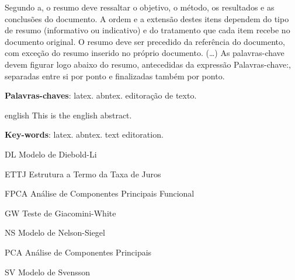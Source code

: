 \documentclass[
	12pt,				%
	openright,			%
	oneside,			%
	a4paper,			%
	english,			%
	brazil				%
	]{dissertacao-ufrgs-abntex2}
\begin{document}

\setlength{\absparsep}{18pt} %
\begin{resumo}
 Segundo a, o resumo deve ressaltar o
 objetivo, o método, os resultados e as conclusões do documento. A ordem e a extensão
 destes itens dependem do tipo de resumo (informativo ou indicativo) e do
 tratamento que cada item recebe no documento original. O resumo deve ser
 precedido da referência do documento, com exceção do resumo inserido no
 próprio documento. (\ldots) As palavras-chave devem figurar logo abaixo do
 resumo, antecedidas da expressão Palavras-chave:, separadas entre si por
 ponto e finalizadas também por ponto.

 \textbf{Palavras-chaves}: latex. abntex. editoração de texto.
\end{resumo}

\begin{resumo}[Abstract]
 \begin{otherlanguage*}{english}
   This is the english abstract.

   \vspace{\onelineskip}
 
   \noindent 
   \textbf{Key-words}: latex. abntex. text editoration.
 \end{otherlanguage*}
\end{resumo}



\begin{siglas}
  \item[DL] Modelo de Diebold-Li
  \item[ETTJ] Estrutura a Termo da Taxa de Juros
  \item[FPCA] Análise de Componentes Principais Funcional
  \item[GW] Teste de Giacomini-White
  \item[NS] Modelo de Nelson-Siegel
  \item[PCA] Análise de Componentes Principais
  \item[SV] Modelo de Svensson
\end{siglas}
\end{document}
